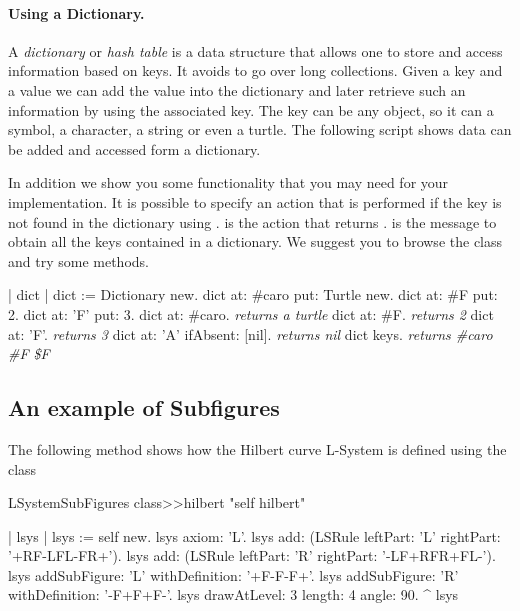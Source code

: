 \paragraph{Using a Dictionary.}
A \emph{dictionary} or \emph{hash table} is a data structure that
allows one to store and access information based on keys.  It avoids
to go over long collections. Given a key and a value we can add the
value into the dictionary and later retrieve such an information by
using the associated key. The key can be any object, so it can a
symbol, a character, a string or even a turtle. The following script
shows data can be added and accessed form a dictionary.

In addition we show you some functionality that you may need for your
implementation.  It is possible to specify an action that is performed
if the key is not found in the dictionary using
. \ct{[nil]} is the action that returns .
 is the message to obtain all the keys contained in a
dictionary. We suggest you to browse the class  and try
some methods.

\begin{scriptwithouttitle}
| dict |
dict := Dictionary new.
dict at: \#caro put: Turtle new.
dict at: \#F put: 2.
dict at: 'F' put: 3.
dict at: \#caro.                    \emph{returns a turtle}
dict at: \#F.                       \emph{returns 2}
dict at: 'F'.                       \emph{returns 3}
dict at: 'A' ifAbsent: [nil].       \emph{returns nil}
dict keys.                          \emph{returns \#caro \#F \$F}
\end{scriptwithouttitle}

\subsection{An example of Subfigures}

The following method shows how the Hilbert curve L-System is defined using the class 

\begin{method}\label{mth:hilbert}
LSystemSubFigures class>>hilbert
   "self hilbert"

   | lsys |
   lsys := self new.
   lsys axiom: 'L'.
   lsys add: (LSRule leftPart: 'L' rightPart: '+RF-LFL-FR+').
   lsys add: (LSRule leftPart: 'R' rightPart: '-LF+RFR+FL-').
   lsys addSubFigure: 'L' withDefinition: '+F-F-F+'.
   lsys addSubFigure: 'R' withDefinition: '-F+F+F-'.
   lsys drawAtLevel: 3 length: 4 angle: 90.
   ^ lsys
\end{method}

